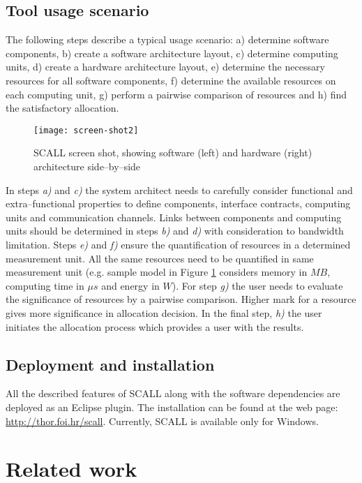 \documentclass{sig-alternate}
\begin{document}
\subsection{Tool usage scenario}

The following steps describe a typical usage scenario: a) determine software components, b) create a software architecture layout, c) determine computing units, d) create a hardware architecture layout, e) determine the necessary resources for all software components, f) determine the available resources on each computing unit, g) perform a pairwise comparison of resources and h) find the satisfactory allocation. 

\begin{figure}[ht]
    \centering
    \texttt{[image: screen-shot2]}
    \caption{SCALL screen shot, showing software (left) and hardware (right) architecture side--by--side }
    \label{fig:screenshot}
\end{figure} 

In steps \textit{a)} and \textit{c)} the system architect needs to carefully consider functional and extra--functional properties to define components, interface contracts, computing units and communication channels. Links between components and computing units should be determined in steps \textit{b)} and \textit{d)} with consideration to bandwidth limitation. Steps \textit{e)} and  \textit{f)} ensure the quantification of resources in a determined measurement unit. All the same resources need to be quantified in same measurement unit (e.g. sample model in Figure \ref{fig:screenshot} considers memory in $\mathit{MB}$, computing time in $\mathit{\mu s}$  and energy in $\mathit{W}$). For step \textit{g)} the user needs to evaluate the significance of resources by a pairwise comparison. Higher mark for a resource gives more significance in allocation decision. In the final step, \textit{h)} the user initiates the allocation process which provides a user with the results.

\subsection{Deployment and installation}


All the described features of SCALL along with the software dependencies are deployed as an Eclipse plugin. The installation can be found at the web page: \url{http://thor.foi.hr/scall}. Currently, SCALL is available only for Windows.

\section{Related work}
\end{document}
